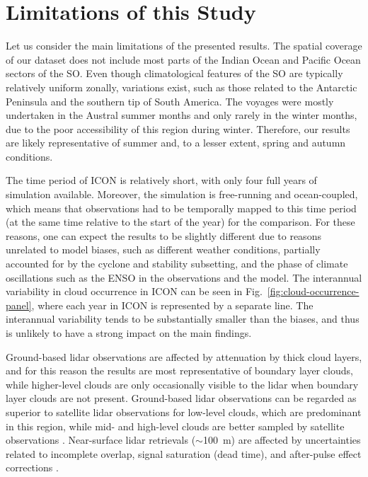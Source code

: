 \documentclass[draft]{agujournal2019}
\begin{document}
\section{Limitations of this Study}
\label{sec:limitations}

Let us consider the main limitations of the presented results. The spatial coverage of our dataset does not include most parts of the Indian Ocean and Pacific Ocean sectors of the SO. Even though climatological features of the SO are typically relatively uniform zonally, variations exist, such as those related to the Antarctic Peninsula and the southern tip of South America. The voyages were mostly undertaken in the Austral summer months and only rarely in the winter months, due to the poor accessibility of this region during winter. Therefore, our results are likely representative of summer and, to a lesser extent, spring and autumn conditions.

The time period of ICON is relatively short, with only four full years of simulation available. Moreover, the simulation is free-running and ocean-coupled, which means that observations had to be temporally mapped to this time period (at the same time relative to the start of the year) for the comparison. For these reasons, one can expect the results to be slightly different due to reasons unrelated to model biases, such as different weather conditions, partially accounted for by the cyclone and stability subsetting, and the phase of climate oscillations such as the ENSO in the observations and the model. The interannual variability in cloud occurrence in ICON can be seen in Fig.~\ref{fig:cloud-occurrence-panel}, where each year in ICON is represented by a separate line. The interannual variability tends to be substantially smaller than the biases, and thus is unlikely to have a strong impact on the main findings.

Ground-based lidar observations are affected by attenuation by thick cloud layers, and for this reason the results are most representative of boundary layer clouds, while higher-level clouds are only occasionally visible to the lidar when boundary layer clouds are not present. Ground-based lidar observations can be regarded as superior to satellite lidar observations for low-level clouds, which are predominant in this region, while mid- and high-level clouds are better sampled by satellite observations \cite{mcerlich2021}. Near-surface lidar retrievals ($\sim$100~m) are affected by uncertainties related to incomplete overlap, signal saturation (dead time), and after-pulse effect corrections \cite{kuma2021}.
\end{document}
